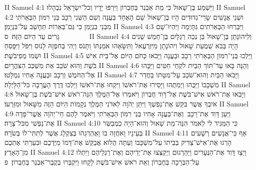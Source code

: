 II Samuel 4:1	וַיִּשְׁמַע בֶּן־שָׁאוּל כִּי מֵת אַבְנֵר בְּחֶבְרוֹן וַיִּרְפּוּ יָדָיו וְכל־יִשְׂרָאֵל נִבְהָלוּ׃
II Samuel 4:2	וּשְׁנֵי אֲנָשִׁים שָׂרֵי־גְדוּדִים הָיוּ בֶן־שָׁאוּל שֵׁם הָאֶחָד בַּעֲנָה וְשֵׁם הַשֵּׁנִי רֵכָב בְּנֵי רִמּוֹן הַבְּאֵרֹתִי מִבְּנֵי בִנְיָמִן כִּי גַּם־בְּאֵרוֹת תֵּחָשֵׁב עַל־בִּנְיָמִן׃
II Samuel 4:3	וַיִּבְרְחוּ הַבְּאֵרֹתִים גִּתָּיְמָה וַיִּהְיוּ־שָׁם גָּרִים עַד הַיּוֹם הַזֶּה׃ {ס}        
II Samuel 4:4	וְלִיהוֹנָתָן בֶּן־שָׁאוּל בֵּן נְכֵה רַגְלָיִם בֶּן־חָמֵשׁ שָׁנִים הָיָה בְּבֹא שְׁמֻעַת שָׁאוּל וִיהוֹנָתָן מִיִּזְרְעֶאל וַתִּשָּׂאֵהוּ אֹמַנְתּוֹ וַתָּנֹס וַיְהִי בְּחפְזָהּ לָנוּס וַיִּפֹּל וַיִּפָּסֵחַ וּשְׁמוֹ מְפִיבֹשֶׁת׃
II Samuel 4:5	וַיֵּלְכוּ בְּנֵי־רִמּוֹן הַבְּאֵרֹתִי רֵכָב וּבַעֲנָה וַיָּבֹאוּ כְּחֹם הַיּוֹם אֶל־בֵּית אִישׁ בֹּשֶׁת וְהוּא שֹׁכֵב אֵת מִשְׁכַּב הַצּהֳרָיִם׃
II Samuel 4:6	וְהֵנָּה בָּאוּ עַד־תּוֹךְ הַבַּיִת לֹקְחֵי חִטִּים וַיַּכֻּהוּ אֶל־הַחֹמֶשׁ וְרֵכָב וּבַעֲנָה אָחִיו נִמְלָטוּ׃
II Samuel 4:7	וַיָּבֹאוּ הַבַּיִת וְהוּא־שֹׁכֵב עַל־מִטָּתוֹ בַּחֲדַר מִשְׁכָּבוֹ וַיַּכֻּהוּ וַיְמִתֻהוּ וַיָּסִירוּ אֶת־רֹאשׁוֹ וַיִּקְחוּ אֶת־רֹאשׁוֹ וַיֵּלְכוּ דֶּרֶךְ הָעֲרָבָה כּל־הַלָּיְלָה׃
II Samuel 4:8	וַיָּבִאוּ אֶת־רֹאשׁ אִישׁ־בֹּשֶׁת אֶל־דָּוִד חֶבְרוֹן וַיֹּאמְרוּ אֶל־הַמֶּלֶךְ הִנֵּה־רֹאשׁ אִישׁ־בֹּשֶׁת בֶּן־שָׁאוּל אֹיִבְךָ אֲשֶׁר בִּקֵּשׁ אֶת־נַפְשֶׁךָ וַיִּתֵּן יְהֹוָה לַאדֹנִי הַמֶּלֶךְ נְקָמוֹת הַיּוֹם הַזֶּה מִשָּׁאוּל וּמִזַּרְעוֹ׃
II Samuel 4:9	וַיַּעַן דָּוִד אֶת־רֵכָב  וְאֶת־בַּעֲנָה אָחִיו בְּנֵי רִמּוֹן הַבְּאֵרֹתִי וַיֹּאמֶר לָהֶם חַי־יְהֹוָה אֲשֶׁר־פָּדָה אֶת־נַפְשִׁי מִכּל־צָרָה׃
II Samuel 4:10	כִּי הַמַּגִּיד לִי לֵאמֹר הִנֵּה־מֵת שָׁאוּל וְהוּא־הָיָה כִמְבַשֵּׂר בְּעֵינָיו וָאֹחֲזָה בוֹ וָאֶהְרְגֵהוּ בְּצִקְלָג אֲשֶׁר לְתִתִּי־לוֹ בְּשֹׂרָה׃
II Samuel 4:11	אַף כִּי־אֲנָשִׁים רְשָׁעִים הָרְגוּ אֶת־אִישׁ־צַדִּיק בְּבֵיתוֹ עַל־מִשְׁכָּבוֹ וְעַתָּה הֲלוֹא אֲבַקֵּשׁ אֶת־דָּמוֹ מִיֶּדְכֶם וּבִעַרְתִּי אֶתְכֶם מִן־הָאָרֶץ׃
II Samuel 4:12	וַיְצַו דָּוִד אֶת־הַנְּעָרִים וַיַּהַרְגוּם וַיְקַצְּצוּ אֶת־יְדֵיהֶם וְאֶת־רַגְלֵיהֶם וַיִּתְלוּ עַל־הַבְּרֵכָה בְּחֶבְרוֹן וְאֵת רֹאשׁ אִישׁ־בֹּשֶׁת לָקָחוּ וַיִּקְבְּרוּ בְקֶבֶר־אַבְנֵר בְּחֶבְרוֹן׃ {פ}
